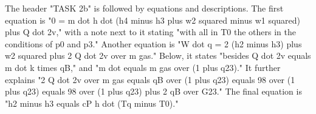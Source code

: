 The header "TASK 2b" is followed by equations and descriptions. The first equation is "0 = m dot h dot (h4 minus h3 plus w2 squared minus w1 squared) plus Q dot 2v," with a note next to it stating "with all in T0 the others in the conditions of p0 and p3." Another equation is "W dot q = 2 (h2 minus h3) plus w2 squared plus 2 Q dot 2v over m gas." Below, it states "besides Q dot 2v equals m dot k times qB," and "m dot equals m gas over (1 plus q23)." It further explains "2 Q dot 2v over m gas equals qB over (1 plus q23) equals 98 over (1 plus q23) equals 98 over (1 plus q23) plus 2 qB over G23." The final equation is "h2 minus h3 equals cP h dot (Tq minus T0)."